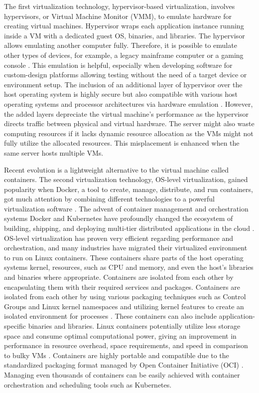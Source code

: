 The first virtualization technology, hypervisor-based virtualization, involves hypervisors, or Virtual Machine Monitor (VMM), to emulate hardware for creating virtual machines. Hypervisor wraps each application instance running inside a VM with a dedicated guest OS, binaries, and libraries. The hypervisor allows emulating another computer fully. Therefore, it is possible to emulate other types of devices, for example, a legacy mainframe computer or a gaming console \cite{Eder2016}. This emulation is helpful, especially when developing software for custom-design platforms allowing testing without the need of a target device or environment setup. The inclusion of an additional layer of hypervisor over the host operating system is highly secure but also compatible with various host operating systems and processor architectures via hardware emulation \cite{Lingayat2018}. However, the added layers depreciate the virtual machine's performance as the hypervisor directs traffic between physical and virtual hardware. The server might also waste computing resources if it lacks dynamic resource allocation as the VMs might not fully utilize the allocated resources. This misplacement is enhanced when the same server hosts multiple VMs.

Recent evolution is a lightweight alternative to the virtual machine called containers. The second virtualization technology, OS-level virtualization, gained popularity when Docker, a tool to create, manage, distribute, and run containers, got much attention by combining different technologies to a powerful virtualization software \cite{Eder2016}. The advent of container management and orchestration systems Docker and Kubernetes have profoundly changed the ecosystem of building, shipping, and deploying multi-tier distributed applications in the cloud \cite{Gao2017}. OS-level virtualization has proven very efficient regarding performance and orchestration, and many industries have migrated their virtualized environment to run on Linux containers. These containers share parts of the host operating systems kernel, resources, such as CPU and memory, and even the host's libraries and binaries where appropriate. Containers are isolated from each other by encapsulating them with their required services and packages. Containers are isolated from each other by using various packaging techniques such as Control Groups and Linux kernel namespaces and utilizing kernel features to create an isolated environment for processes \cite{Flauzac2020}. These containers can also include application-specific binaries and libraries. Linux containers potentially utilize less storage space and consume optimal computational power, giving an improvement in performance in resource overhead, space requirements, and speed in comparison to bulky VMs \cite{Lingayat2018}\cite{Toimela2017}. Containers are highly portable and compatible due to the standardized packaging format managed by Open Container Initiative (OCI) \cite{OCI}. Managing even thousands of containers can be easily achieved with container orchestration and scheduling tools such as Kubernetes.

